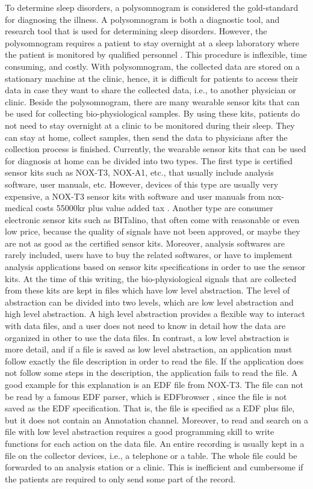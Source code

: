 To determine sleep disorders, a polysomnogram is considered the gold-standard for diagnosing the illness. A polysomnogram is both a diagnostic tool, and research tool that is used for determining sleep disorders. However, the polysomnogram requires a patient to stay overnight at a sleep laboratory where the patient is monitored by qualified personnel \citep{NCBINLM}. This procedure is inflexible, time consuming, and costly. With polysomnogram, the collected data are stored on a stationary machine at the clinic, hence, it is difficult for patients to access their data in case they want to share the collected data, i.e., to another physician or clinic. Beside the polysomnogram, there are many wearable sensor kits that can be used for collecting bio-physiological samples. By using these kits, patients do not need to stay overnight at a clinic to be monitored during their sleep. They can stay at home, collect samples, then send the data to physicians after the collection process is finished. Currently, the wearable sensor kits that can be used for diagnosis at home can be divided into two types. The first type is certified sensor kits such as NOX-T3, NOX-A1, etc., that usually include analysis software, user manuals, etc. However, devices of this type are usually very expensive, a NOX-T3 sensor kits with software and user manuals from nox-medical costs 55000kr plus value added tax \citep{Thomas}. Another type are consumer electronic sensor kits such as BITalino, that often come with reasonable or even low price, because the quality of signals have not been approved, or maybe they are not as good as the certified sensor kits. Moreover, analysis softwares are rarely included, users have to buy the related softwares, or have to implement analysis applications based on sensor kits specifications in order to use the sensor kits. At the time of this writing, the bio-physiological signals that are collected from these kits are kept in files which have low level abstraction. The level of abstraction can be divided into two levels, which are low level abstraction and high level abstraction. A high level abstraction provides a flexible way to interact with data files, and a user does not need to know in detail how the data are organized in other to use the data files. In contrast, a low level abstraction is more detail, and if a file is saved as low level abstraction, an application must follow exactly the file description in order to read the file. If the application does not follow some steps in the description, the application fails to read the file. A good example for this explanation is an EDF file from NOX-T3. The file can not be read by a famous EDF parser, which is EDFbrowser \citep{EDFLIB}, since the file is not saved as the EDF specification. That is, the file is specified as a EDF plus file, but it does not contain an Annotation channel. Moreover, to read and search on a file with low level abstraction requires a good programming skill to write functions for each action on the data file. An entire recording is usually kept in a file on the collector devices, i.e., a telephone or a table. The whole file could be forwarded to an analysis station or a clinic. This is inefficient and cumbersome if the patients are required to only send some part of the record.\\\\
